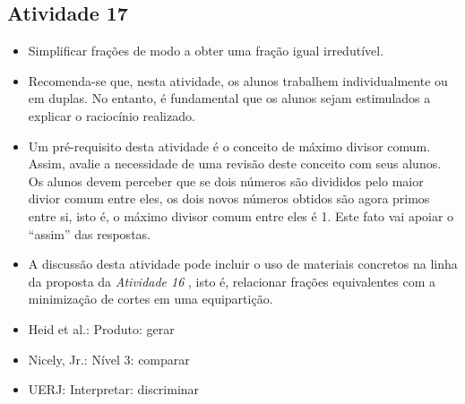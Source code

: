 \newpage
\begin{multicols}{2}
\subsection{Atividade 17}

\begin{itemize} %
    \item       Simplificar frações de modo a obter uma fração igual
irredutível.
\end{itemize} %


\begin{itemize} %
    \item       Recomenda-se que, nesta atividade, os alunos trabalhem
individualmente ou em duplas. No entanto, é fundamental que os alunos sejam
estimulados a explicar o raciocínio realizado.
    \item       Um pré-requisito desta atividade é o conceito de máximo divisor
comum. Assim, avalie a necessidade de uma revisão deste conceito com seus
alunos. Os alunos devem perceber que se dois números são divididos pelo maior
divior comum entre eles, os dois novos números obtidos são agora primos entre
si, isto é, o máximo divisor comum entre eles é 1. Este fato vai apoiar o
``assim''       das respostas.
    \item       A discussão desta atividade pode incluir o uso de materiais
concretos na linha da proposta da \emph{Atividade 16}      , isto é, relacionar
frações equivalentes com a minimização de cortes em uma equipartição.
\end{itemize} %

   \vspace{.1cm}

 \vspace{.1cm}

\begin{itemize} %
    \item       Heid et al.: Produto: gerar
    \item       Nicely, Jr.: Nível 3: comparar
    \item       UERJ: Interpretar: discriminar
\end{itemize} %


\end{multicols}
